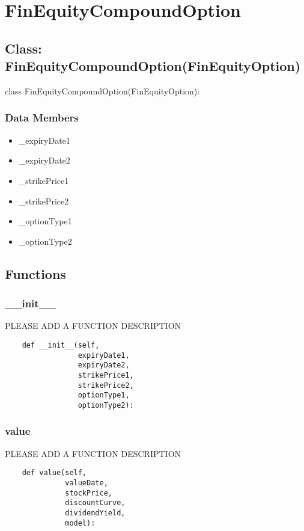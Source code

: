 \documentclass[twoside,11pt]{book}
\begin{document}
\newpage
\section{FinEquityCompoundOption}

\subsection*{Class: FinEquityCompoundOption(FinEquityOption)}
class FinEquityCompoundOption(FinEquityOption): 

\subsubsection*{Data Members}
\begin{itemize}
\item{\_expiryDate1}
\item{\_expiryDate2}
\item{\_strikePrice1}
\item{\_strikePrice2}
\item{\_optionType1}
\item{\_optionType2}
\end{itemize}

\subsection*{Functions}

\subsubsection*{{\bf \_\_init\_\_}}
PLEASE ADD A FUNCTION DESCRIPTION

\begin{lstlisting}
    def __init__(self,
                 expiryDate1,
                 expiryDate2,
                 strikePrice1,
                 strikePrice2,
                 optionType1,
                 optionType2):
\end{lstlisting}

\subsubsection*{{\bf value}}
PLEASE ADD A FUNCTION DESCRIPTION

\begin{lstlisting}
    def value(self,
              valueDate,
              stockPrice,
              discountCurve,
              dividendYield,
              model):
\end{lstlisting}
\end{document}
